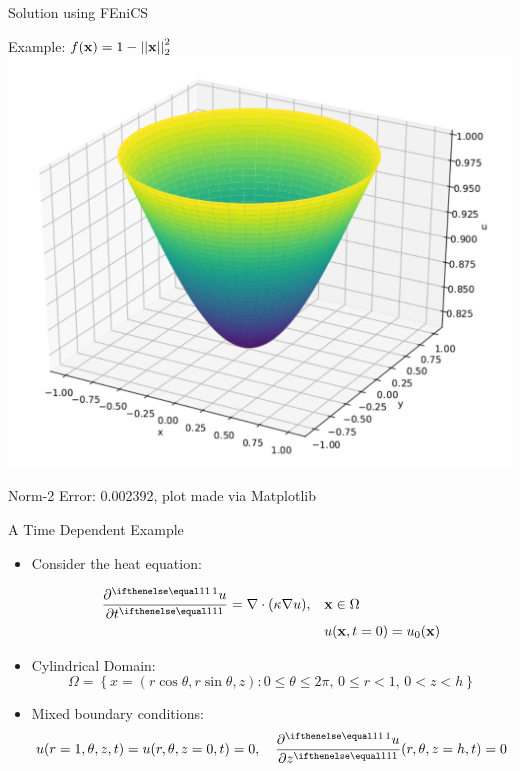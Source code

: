 \documentclass[serif]{beamer}
\begin{document}
\begin{frame}{Solution using FEniCS}

    Example: $f(\mathbf{x}) = 1 - \left|\left| \mathbf{x} \right|\right|^2_2$
    \centering
    \includegraphics[height=0.75\textheight]{figures/fenics-laplace-circle.pdf}
    
    Norm-2 Error: 0.002392, plot made via Matplotlib
    
\end{frame}


\begin{frame}{A Time Dependent Example}
    \begin{itemize}
        \item Consider the heat equation:
        
        \begin{equation}
            \label{eq:heat-dirichlet-circle}
            \begin{split}
            \pder{u}{t} = \nabla \cdot (\kappa \nabla u), \quad & \vec x \in \Omega \\
            & u(\vec x, t=0) = u_0(\vec x)
            \end{split}
        \end{equation}
			\item Cylindrical Domain:
				\[
					\Omega = \left\{x = (r \cos\theta, r \sin \theta, z) : 0 \leq \theta \leq 2\pi, \, 0 \leq r < 1, \, 0 < z < h\right\}
				\] 
			\item Mixed boundary conditions:
        \[
					u(r=1, \theta, z, t) = u(r, \theta, z=0, t) = 0, \quad 
					\pder{u}{z}(r, \theta, z=h, t) = 0
        \] 
    \end{itemize}
\end{frame}
\end{document}
